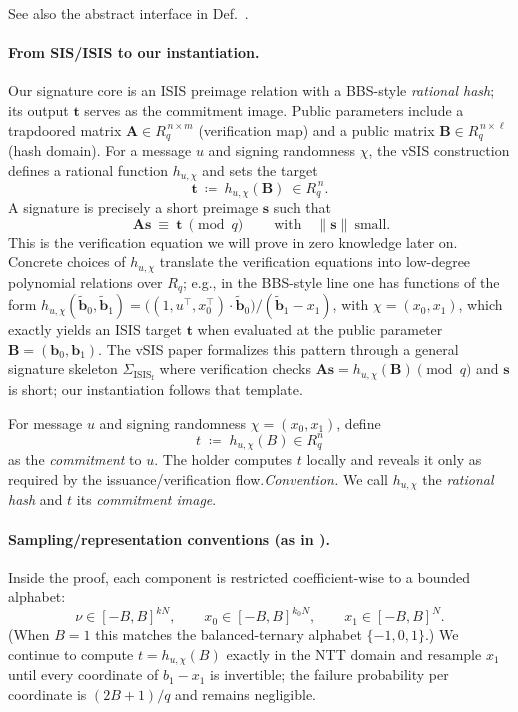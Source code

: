See also the abstract interface in Def.~.

\paragraph{From SIS/ISIS to our instantiation.}
Our signature core is an ISIS preimage relation with a BBS-style \emph{rational hash}; its output \(\mathbf{t}\) serves as the commitment image.
Public parameters include a trapdoored matrix \(\mathbf{A}\in R_q^{\,n\times m}\) (verification map) and a
public matrix \(\mathbf{B}\in R_q^{\,n\times \ell}\) (hash domain). For a message \(u\) and signing randomness
\(\chi\), the vSIS construction defines a rational function \(h_{u,\chi}\) and sets the target
\[
  \mathbf{t}\ \coloneqq\ h_{u,\chi}(\mathbf{B})\ \in R_q^{\,n}.
\]
A signature is precisely a short preimage \(\mathbf{s}\) such that
\[
  \boxed{\ \mathbf{A}\mathbf{s}\ \equiv\ \mathbf{t}\ \pmod q\ } \qquad\text{with}\quad \|\mathbf{s}\|\ \text{small}.
\]
This is the verification equation we will prove in zero knowledge later on.
Concrete choices of \(h_{u,\chi}\) translate the verification equations into low-degree
polynomial relations over \(R_q\); e.g., in the BBS-style line one has functions of the form
\(h_{u,\chi}(\tilde{\mathbf{b}}_0,\tilde{\mathbf{b}}_1)
  = \big((1,u^\top,x_0^\top)\cdot \tilde{\mathbf{b}}_0\big)\big/(\tilde{\mathbf{b}}_1-x_1)\),
with \(\chi=(x_0,x_1)\), which exactly yields an ISIS target \(\mathbf{t}\) when evaluated at the public
parameter \(\mathbf{B}=(\mathbf{b}_0,\mathbf{b}_1)\). The vSIS paper formalizes this pattern through a
general signature skeleton \(\Sigma_{\mathrm{ISIS_f}}\) where verification checks \(\mathbf{A}\mathbf{s}=h_{u,\chi}(\mathbf{B})\pmod q\)
and \(\mathbf{s}\) is short; our instantiation follows that template. 

\begin{definition}
For message $u$ and signing randomness $\chi=(x_0,x_1)$, define
\[
  t\;\coloneqq\;h_{u,\chi}(B)\in R_q^n
\]
as the \emph{commitment} to $u$. The holder computes $t$ locally and reveals it only as required by the issuance/verification flow.\;\emph{Convention.} We call $h_{u,\chi}$ the \emph{rational hash} and $t$ its \emph{commitment image}.
\end{definition}

\paragraph{Sampling/representation conventions (as in \cite{cryptoeprint:2025/356}).}
Inside the proof, each component is restricted coefficient-wise to a bounded alphabet:
\[\nu \in [-B,B]^{kN},\qquad x_0 \in [-B,B]^{k_0N},\qquad x_1 \in [-B,B]^{N}.\]
(When $B{=}1$ this matches the balanced-ternary alphabet $\{-1,0,1\}$.)
We continue to compute $t=h_{u,\chi}(B)$ exactly in the NTT domain and resample $x_1$ until every coordinate of $b_1-x_1$ is invertible; the failure probability per coordinate is $(2B{+}1)/q$ and remains negligible.

